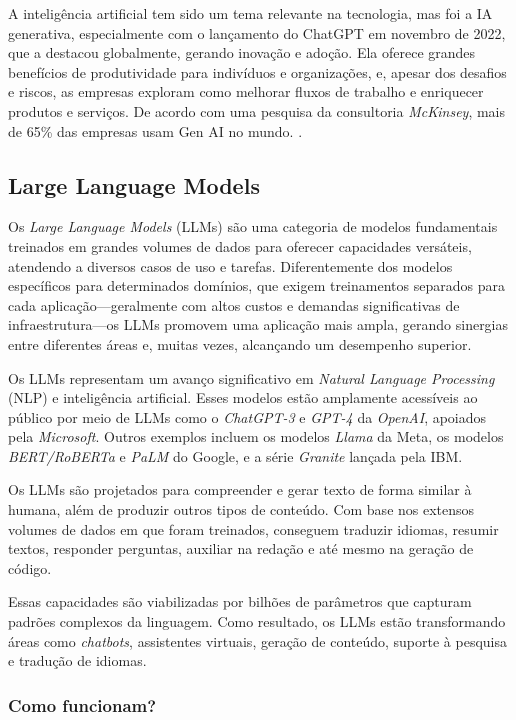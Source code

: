 \documentclass[a4paper, 12pt]{article}
\newcommand{\citeb}[1]{\bibleftbracket\cite{#1}\bibrightbracket}
\begin{document}
    A inteligência artificial tem sido um tema relevante na tecnologia, mas foi a IA generativa, especialmente com o lançamento do ChatGPT em novembro de 2022, que a destacou globalmente, gerando inovação e adoção. Ela oferece grandes benefícios de produtividade para indivíduos e organizações, e, apesar dos desafios e riscos, as empresas exploram como melhorar fluxos de trabalho e enriquecer produtos e serviços. De acordo com uma pesquisa da consultoria \textit{McKinsey}, mais de 65\% das empresas usam Gen AI no mundo. \citeb{mckinsey_genai}.


    \subsection{Large Language Models}

    Os \textit{Large Language Models} (LLMs) são uma categoria de modelos fundamentais treinados em grandes volumes de dados para oferecer capacidades versáteis, atendendo a diversos casos de uso e tarefas. Diferentemente dos modelos específicos para determinados domínios, que exigem treinamentos separados para cada aplicação—geralmente com altos custos e demandas significativas de infraestrutura—os LLMs promovem uma aplicação mais ampla, gerando sinergias entre diferentes áreas e, muitas vezes, alcançando um desempenho superior. \citeb{llm_ibm}

    Os LLMs representam um avanço significativo em \textit{Natural Language Processing} (NLP) e inteligência artificial. Esses modelos estão amplamente acessíveis ao público por meio de LLMs como o \textit{ChatGPT-3} e \textit{GPT-4} da \textit{OpenAI}, apoiados pela \textit{Microsoft}. Outros exemplos incluem os modelos \textit{Llama} da Meta, os modelos \textit{BERT/RoBERTa} e \textit{PaLM} do Google, e a série \textit{Granite} lançada pela IBM.

    Os LLMs são projetados para compreender e gerar texto de forma similar à humana, além de produzir outros tipos de conteúdo. Com base nos extensos volumes de dados em que foram treinados, conseguem traduzir idiomas, resumir textos, responder perguntas, auxiliar na redação e até mesmo na geração de código.

    Essas capacidades são viabilizadas por bilhões de parâmetros que capturam padrões complexos da linguagem. Como resultado, os LLMs estão transformando áreas como \textit{chatbots}, assistentes virtuais, geração de conteúdo, suporte à pesquisa e tradução de idiomas.

    \subsubsection{Como funcionam?}
\end{document}
